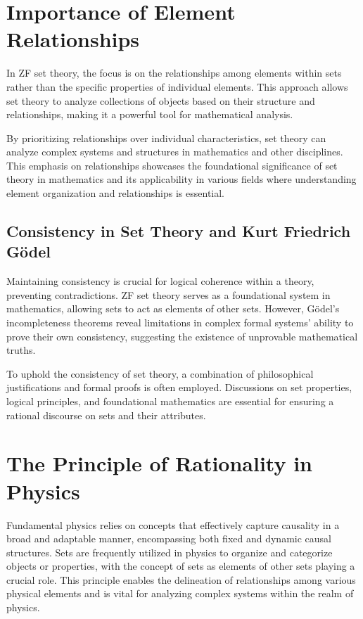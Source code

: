 \documentclass{article}
\begin{document}
\section{Importance of Element Relationships}

In ZF set theory, the focus is on the relationships among elements within sets rather than the specific properties of individual elements. This approach allows set theory to analyze collections of objects based on their structure and relationships, making it a powerful tool for mathematical analysis.

By prioritizing relationships over individual characteristics, set theory can analyze complex systems and structures in mathematics and other disciplines. This emphasis on relationships showcases the foundational significance of set theory in mathematics and its applicability in various fields where understanding element organization and relationships is essential.

\subsection{Consistency in Set Theory and Kurt Friedrich Gödel}

Maintaining consistency is crucial for logical coherence within a theory, preventing contradictions. ZF set theory serves as a foundational system in mathematics, allowing sets to act as elements of other sets. However, Gödel's incompleteness theorems reveal limitations in complex formal systems' ability to prove their own consistency, suggesting the existence of unprovable mathematical truths.

To uphold the consistency of set theory, a combination of philosophical justifications and formal proofs is often employed. Discussions on set properties, logical principles, and foundational mathematics are essential for ensuring a rational discourse on sets and their attributes.
\section{The Principle of Rationality in Physics}

Fundamental physics relies on concepts that effectively capture causality in a broad and adaptable manner, encompassing both fixed and dynamic causal structures. Sets are frequently utilized in physics to organize and categorize objects or properties, with the concept of sets as elements of other sets playing a crucial role. This principle enables the delineation of relationships among various physical elements and is vital for analyzing complex systems within the realm of physics.
\end{document}

